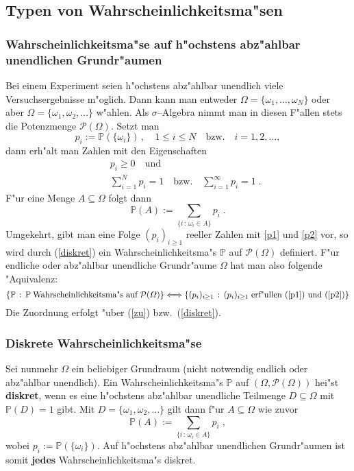 \documentclass[ngerman,draft,parskip=half,twoside]{scrartcl}
\newcommand*{\PotM}{\mathcal{P}}    %
\newcommand*{\WKM}{\mathbb{P}}      %
\begin{document}
\subsection{Typen von Wahrscheinlichkeitsma"sen}
\subsubsection{Wahrscheinlichkeitsma"se auf h"ochstens abz"ahlbar unendlichen Grundr"aumen}
Bei einem Experiment seien h"ochstens abz"ahlbar unendlich viele Versuchsergebnisse
m"oglich. Dann kann man entweder $\Omega=\{\omega_1,\ldots,\omega_N\}$ oder
aber $\Omega=\{\omega_1,\omega_2,\ldots\}$ w"ahlen. Als $\sigma$--Algebra nimmt man in diesen
F"allen stets die Potenzmenge $\PotM(\Omega)$. Setzt man
\begin{equation}
\label{zu}
p_i :=\WKM(\{\omega_i\})\,,\quad 1\le i\le N\quad\mbox{bzw.}\quad i=1,2,\ldots,
\end{equation}
dann erh"alt man Zahlen mit den Eigenschaften
\begin{eqnarray}
\label{p1}
&&p_i\ge 0\quad \mbox{und}\\
\label{p2}
&&\sum_{i=1}^N p_i =1\quad \mbox{bzw.}\quad \sum_{i=1}^\infty p_i =1\;.
\end{eqnarray}
F"ur eine Menge $A\subseteq \Omega$ folgt dann
\begin{equation}
\label{diskret}
\WKM(A):= \sum_{\{i\, : \,\omega_i\in A\}} p_i\;.
\end{equation}
Umgekehrt, gibt man eine Folge $(p_i)_{i\ge 1}$ reeller Zahlen mit \eqref{p1} und \eqref{p2} vor,
so wird durch (\ref{diskret}) ein Wahrscheinlichkeitsma"s $\WKM$ auf $\PotM(\Omega)$ definiert. F"ur
endliche oder abz"ahlbar unendliche Grundr"aume $\Omega$ hat man also folgende "Aquivalenz$\colon$
$$
\{\WKM\,:\,\WKM\;\mbox{Wahrscheinlichkeitsma"s auf}\;\PotM(\Omega)\}
\Longleftrightarrow\{(p_i)_{i\ge 1}\,:\, (p_i)_{i\ge 1}\;\mbox{erf"ullen (\ref{p1}) und (\ref{p2})}\}
$$
Die Zuordnung erfolgt "uber (\ref{zu}) bzw.~(\ref{diskret}).

\subsubsection{Diskrete Wahrscheinlichkeitsma"se}
Sei nunmehr $\Omega$ ein beliebiger Grundraum (nicht notwendig endlich
oder abz"ahlbar unendlich). Ein Wahrscheinlichkeitsma"s $\WKM$ auf $(\Omega,\PotM(\Omega))$
hei"st \textbf{diskret}, wenn es eine h"ochstens abz"ahlbar unendliche Teilmenge $D\subseteq \Omega$
mit $\WKM(D)=1$ gibt. Mit $D=\{\omega_1,\omega_2,\ldots\}$ gilt dann f"ur $A\subseteq \Omega$ wie zuvor
$$
\WKM(A):= \sum_{\{i\, : \,\omega_i\in A\}} p_i\;,
$$
wobei $p_i:=\WKM(\{\omega_i\})$. Auf h"ochstens abz"ahlbar unendlichen Grundr"aumen ist somit \textbf{jedes}
Wahrscheinlichkeitsma"s diskret.
\end{document}
